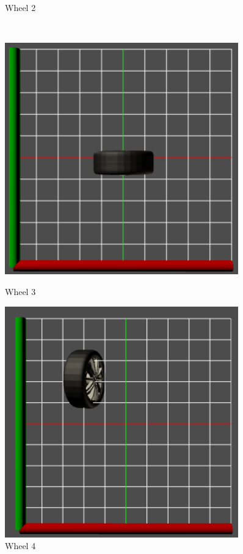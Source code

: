 \begin{figure}[htbp]
\begin{minipage}{.5\textwidth}
  	\caption{Wheel 2}
  	\label{fig:wheel2}
  \end{minipage}\\
  \begin{minipage}{.5\textwidth}
  	\includegraphics[width=0.9\textwidth]{../assets/wheel3.png}
  	\caption{Wheel 3}
  	\label{fig:wheel3}
  \end{minipage}
  \begin{minipage}{.5\textwidth}
  	\includegraphics[width=0.9\textwidth]{../assets/wheel4.png}
  	\caption{Wheel 4}
  	\label{fig:wheel4}
  \end{minipage}
\end{figure}

